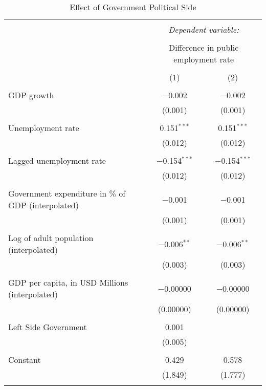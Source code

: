 
\begin{table}[!htbp] \centering 
  \caption{Effect of Government Political Side} 
  \label{} 
\begin{tabular}{@{\extracolsep{5pt}}lcc} 
\\[-1.8ex]\hline 
\hline \\[-1.8ex] 
 & \multicolumn{2}{c}{\textit{Dependent variable:}} \\ 
\cline{2-3} 
\\[-1.8ex] & \multicolumn{2}{c}{Difference in public employment rate} \\ 
\\[-1.8ex] & (1) & (2)\\ 
\hline \\[-1.8ex] 
 GDP growth & $-$0.002 & $-$0.002 \\ 
  & (0.001) & (0.001) \\ 
  & & \\ 
 Unemployment rate & 0.151$^{***}$ & 0.151$^{***}$ \\ 
  & (0.012) & (0.012) \\ 
  & & \\ 
 Lagged unemployment rate & $-$0.154$^{***}$ & $-$0.154$^{***}$ \\ 
  & (0.012) & (0.012) \\ 
  & & \\ 
 Government expenditure in \% of GDP (interpolated) & $-$0.001 & $-$0.001 \\ 
  & (0.001) & (0.001) \\ 
  & & \\ 
 Log of adult population (interpolated) & $-$0.006$^{**}$ & $-$0.006$^{**}$ \\ 
  & (0.003) & (0.003) \\ 
  & & \\ 
 GDP per capita, in USD Millions (interpolated) & $-$0.00000 & $-$0.00000 \\ 
  & (0.00000) & (0.00000) \\ 
  & & \\ 
 Left Side Government & 0.001 &  \\ 
  & (0.005) &  \\ 
  & & \\ 
 Constant & 0.429 & 0.578 \\ 
  & (1.849) & (1.777) \\ 
  & & \\ 

\end{tabular}
\end{table}
